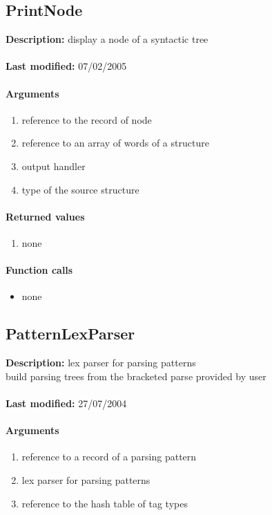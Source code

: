 \subsection{PrintNode}
\textbf{Description:} display a node of a syntactic tree\\
\\\textbf{Last modified:} 07/02/2005

\paragraph{Arguments}
\begin{enumerate}
\item reference to the record of node
\item reference to an array of words of a structure
\item output handler
\item type of the source structure
\end{enumerate}

\paragraph{Returned values}
\begin{enumerate}
\item none
\end{enumerate}

\paragraph{Function calls}
\begin{itemize}
\item none
\end{itemize}

\subsection{PatternLexParser}
\textbf{Description:} lex parser for parsing patterns\\
build parsing trees from the bracketed parse provided by user\\
\\\textbf{Last modified:} 27/07/2004

\paragraph{Arguments}
\begin{enumerate}
\item reference to a record of a parsing pattern
\item lex parser for parsing patterns
\item reference to the hash table of tag types
\end{enumerate}

